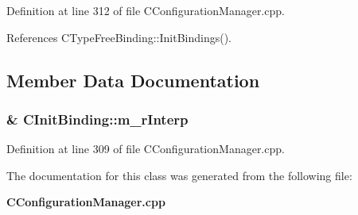 Definition at line 312 of file CConfiguration\-Manager.cpp.

References CType\-Free\-Binding::Init\-Bindings().

\subsection{Member Data Documentation}
\subsubsection{\& CInit\-Binding::m\_\-r\-Interp\hspace{0.3cm}{\tt  [private]}}\label{classCInitBinding_o0}




Definition at line 309 of file CConfiguration\-Manager.cpp.

The documentation for this class was generated from the following file:\begin{CompactItemize}
\item 
{\bf CConfiguration\-Manager.cpp}\end{CompactItemize}
